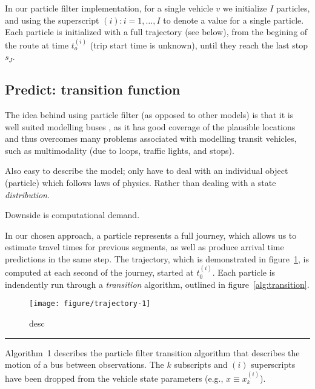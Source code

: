 \documentclass[draftcls,a4paper,onecolumn]{IEEEtran}\usepackage[]{graphicx}\usepackage[]{color}
\newenvironment{knitrout}{}{} %
\begin{document}
In our particle filter implementation,
for a single vehicle $v$ we initialize $I$ particles,
and using the superscript $(i) : i = 1, \ldots, I$ to denote 
a value for a single particle.
Each particle is initialized with a full trajectory (see below),
from the begining of the route at time $t_o^{(i)}$ (trip start time is unknown),
until they reach the last stop $s_J$.



\subsection{Predict: transition function}
The idea behind using particle filter (as opposed to other models)
is that it is well suited modelling buses \cite{Hans_2015},
as it has good coverage of the plausible locations and thus overcomes
many problems associated with modelling transit vehicles,
such as multimodality (due to loops, traffic lights, and stops).

Also easy to describe the model;
only have to deal with an individual object (particle) which follows 
laws of physics.
Rather than dealing with a state \emph{distribution}.

Downside is computational demand.

In our chosen approach, a particle represents a full journey,
which allows us to estimate travel times for previous segments, 
as well as produce arrival time predictions in the same step.
The trajectory, which is demonstrated in figure~\ref{fig:trajectory},
is computed at each second of the journey, started at $t_0^{(i)}$.
Each particle is indendently run through a \emph{transition} algorithm,
outlined in figure~\ref{alg:transition}.

\begin{knitrout}
\color{fgcolor}\begin{figure}
\texttt{[image: figure/trajectory-1]} \caption[short desc]{desc}\label{fig:trajectory}
\end{figure}


\end{knitrout}


\vspace{1em}\hrule\vspace{1em}

Algorithm~1 describes the particle filter transition algorithm that
describes the motion of a bus between observations.
The $k$ subscripts and $(i)$ superscripts have been dropped from the
vehicle state parameters (e.g., $x \equiv x_k^{(i)}$).
\end{document}
